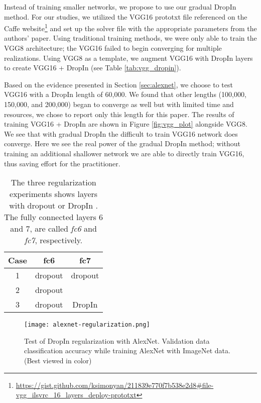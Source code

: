 \documentclass[10pt,twocolumn,letterpaper]{article}
\newcommand{\dropin}{DropIn }
\begin{document}
Instead of training smaller networks, we propose to use our gradual DropIn method.  
For our studies, we utilized the VGG16 prototxt file referenced on the Caffe website\footnote{\url{https://gist.github.com/ksimonyan/211839e770f7b538e2d8\#file-vgg_ilsvrc_16_layers_deploy-prototxt}} 
and set up the solver file with the appropriate parameters from the authors' paper.  Using traditional training methods, we were only able to train the VGG8 architecture;  the VGG16 failed to begin converging for multiple realizations.  Using VGG8 as a template,  we augment VGG16 with \dropin layers to create VGG16 + \dropin (see Table \ref{tab:vgg_dropin}).  

Based on the evidence presented in Section \ref{sec:alexnet}, we choose to test VGG16 with a \dropin length of 60,000. We found that other lengths (100,000, 150,000, and 200,000) began to converge as well but with limited time and resources, we chose to report only this length for this paper.
The results of training VGG16 + \dropin are shown in Figure \ref{fig:vgg_plot} alongside VGG8.  We see that with gradual \dropin the difficult to train VGG16 network does converge.  Here we see the real power of the gradual \dropin method; without training an additional shallower network we are able to directly train VGG16,  thus saving effort for the practitioner. %


\begin{table}[h]
  \vspace{-5pt}
\begin{center}
  \begin{tabular}{| c | c | c |}
    \hline
    Case & fc6 & fc7 \\ \hline \hline
   1 & dropout  & dropout \\ \hline
   2 & dropout  &  \\ \hline
   3 & dropout  & \dropin \\ \hline
  \end{tabular}
  \caption{The three regularization experiments shows layers with dropout or \dropin. The fully connected layers 6 and 7, are called \textit{fc6} and \textit{fc7}, respectively. }
  \label{tab:reg}
\end{center}
  \vspace{-15pt}
\end{table}


\begin{figure}[h]
\begin{center}
   \texttt{[image: alexnet-regularization.png]}
\end{center}
  \vspace{-10pt}
   \caption{Test of \dropin regularization with AlexNet. Validation data classification accuracy while training AlexNet with ImageNet data.  %
(Best viewed in color) 
}
\label{fig:regularization}
  \vspace{-15pt}
\end{figure}
\end{document}
